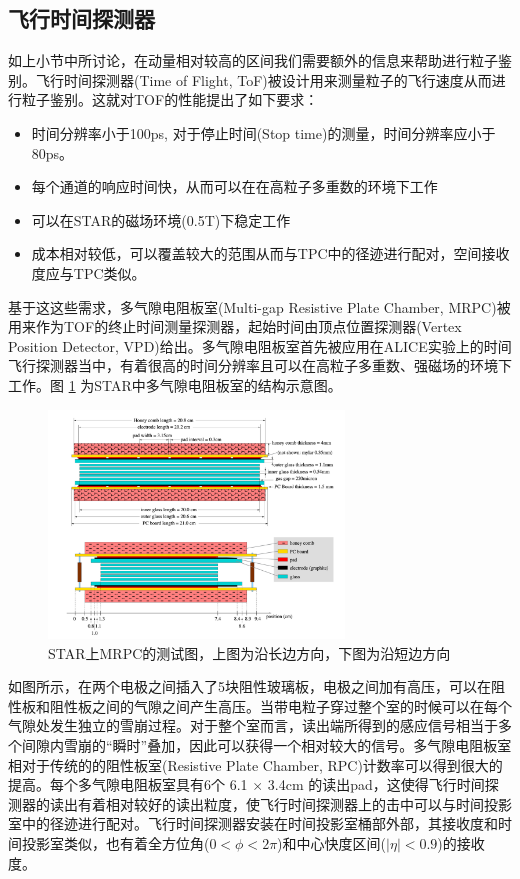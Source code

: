 \subsection{飞行时间探测器}
\label{chap:TOF}
如上小节中所讨论，在动量相对较高的区间我们需要额外的信息来帮助进行粒子鉴别。飞行时间探测器(Time of Flight, ToF)被设计用来测量粒子的飞行速度从而进行粒子鉴别。这就对TOF的性能提出了如下要求：
\begin{itemize}
    \item 时间分辨率小于100ps, 对于停止时间(Stop time)的测量，时间分辨率应小于80ps。
    \item 每个通道的响应时间快，从而可以在在高粒子多重数的环境下工作
    \item 可以在STAR的磁场环境(0.5T)下稳定工作
    \item 成本相对较低，可以覆盖较大的范围从而与TPC中的径迹进行配对，空间接收度应与TPC类似。
\end{itemize}

基于这这些需求，多气隙电阻板室(Multi-gap Resistive Plate Chamber, MRPC)被用来作为TOF的终止时间测量探测器，起始时间由顶点位置探测器(Vertex Position Detector, VPD)给出。多气隙电阻板室首先被应用在ALICE实验上的时间飞行探测器当中，有着很高的时间分辨率且可以在高粒子多重数、强磁场的环境下工作。图 \ref{fig:MRPC} 为STAR中多气隙电阻板室的结构示意图。
\begin{figure}[htb]
    \begin{center}
    \includegraphics[width=0.7\textwidth,clip]{figures/Chapter2/MRPC.png}
    \end{center}
    \caption[MRPC结构示意图]{STAR上MRPC的测试图，上图为沿长边方向，下图为沿短边方向}
    \label{fig:MRPC}
\end{figure}
如图所示，在两个电极之间插入了5块阻性玻璃板，电极之间加有高压，可以在阻性板和阻性板之间的气隙之间产生高压。当带电粒子穿过整个室的时候可以在每个气隙处发生独立的雪崩过程。对于整个室而言，读出端所得到的感应信号相当于多个间隙内雪崩的“瞬时”叠加，因此可以获得一个相对较大的信号。多气隙电阻板室相对于传统的的阻性板室(Resistive Plate Chamber, RPC)计数率可以得到很大的提高。每个多气隙电阻板室具有6个 6.1 $\times$ 3.4cm 的读出pad，这使得飞行时间探测器的读出有着相对较好的读出粒度，使飞行时间探测器上的击中可以与时间投影室中的径迹进行配对。飞行时间探测器安装在时间投影室桶部外部，其接收度和时间投影室类似，也有着全方位角($ 0 < \phi < 2\pi$)和中心快度区间($ |\eta| < 0.9 $)的接收度。


